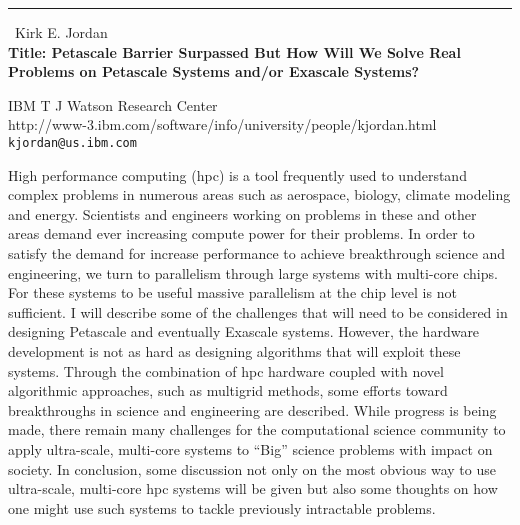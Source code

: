\documentclass{report}
\begin{document}
\begin{center}
\rule{6in}{1pt} \
{\large Kirk E. Jordan \\
{\bf Title: Petascale Barrier Surpassed But How Will We Solve Real Problems on Petascale Systems and/or Exascale Systems? }}

IBM T J Watson Research Center \\ http://www-3.ibm.com/software/info/university/people/kjordan.html
\\
{\tt kjordan@us.ibm.com}\end{center}

High performance computing (hpc) is a tool frequently used to understand
complex problems in numerous areas such as aerospace, biology, climate
modeling and energy. Scientists and engineers working on problems in
these and other areas demand ever increasing compute power for their
problems. In order to satisfy the demand for increase performance to
achieve breakthrough science and engineering, we turn to parallelism
through large systems with multi-core chips. For these systems to be
useful massive parallelism at the chip level is not sufficient. I will
describe some of the challenges that will need to be considered in
designing Petascale and eventually Exascale systems. However, the
hardware development is not as hard as designing algorithms that will
exploit these systems. Through the combination of hpc hardware coupled
with novel algorithmic approaches, such as multigrid methods, some
efforts toward breakthroughs in science and engineering are described.
While progress is being made, there remain many challenges for the
computational science community to apply ultra-scale, multi-core systems
to ``Big'' science problems with impact on society. In conclusion, some
discussion not only on the most obvious way to use ultra-scale,
multi-core hpc systems will be given but also some thoughts on how one
might use such systems to tackle previously intractable problems.
\end{document}
